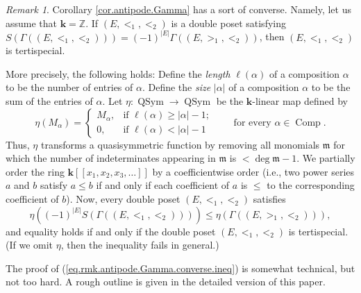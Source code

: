 \documentclass[12pt]{article}
\theoremstyle{plain}
\theoremstyle{definition}
\theoremstyle{remark}
\newtheorem{remark}[theorem]{Remark}
\newcommand{\kk}{{\mathbf{k}}}
\newcommand{\Comp}{{\operatorname{Comp}}}
\newcommand{\QSym}{{\operatorname{QSym}}}
\newcommand{\ZZ}{{\mathbb{Z}}}
\begin{document}
\begin{remark}
\label{rmk.antipode.Gamma.converse}
Corollary \ref{cor.antipode.Gamma} has a
sort of converse. Namely, let us assume that $\kk = \ZZ$. If
$\left(  E,<_{1},<_{2}\right)  $ is a double poset satisfying $S\left(
\Gamma\left(  \left(  E,<_{1},<_{2}\right)  \right)  \right)  =\left(
-1\right)  ^{\left\vert E\right\vert }\Gamma\left(  \left(  E,>_{1}%
,<_{2}\right)  \right)  $, then $\left(  E,<_{1},<_{2}\right)  $ is tertispecial.

More precisely, the following holds: Define the \textit{length} $\ell\left(
\alpha\right)  $ of a composition $\alpha$ to be the number of entries of
$\alpha$. Define the \textit{size} $\left\vert \alpha\right\vert $ of a
composition $\alpha$ to be the sum of the entries of $\alpha$. Let
$\eta : \QSym \to \QSym$ be the $\kk$-linear map defined by
\[
\eta \left( M_{\alpha} \right)
=
\begin{cases}
M_{\alpha}, & \text{if }\ell\left(  \alpha\right)  \geq\left\vert
\alpha\right\vert -1;\\
0, & \text{if }\ell\left(  \alpha\right)  <\left\vert \alpha\right\vert -1
\end{cases}
\qquad \text{for every } \alpha \in \Comp .
\]
Thus, $\eta$ transforms a quasisymmetric function by removing all monomials
$\mathfrak{m}$ for which the number of indeterminates appearing in
$\mathfrak{m}$ is $<\deg\mathfrak{m}-1$. We partially order the ring
$\mathbf{k}\left[  \left[ x_1, x_2, x_3, \ldots \right]  \right]  $
by a coefficientwise
order (i.e., two power series $a$ and $b$ satisfy $a\leq b$ if and only if
each coefficient of $a$ is $\leq$ to the corresponding coefficient of $b$).
Now, every double poset $\left(  E,<_{1},<_{2}\right)  $ satisfies
\begin{equation}
\eta\left(  \left(  -1\right)  ^{\left\vert E\right\vert }S\left(
\Gamma\left(  \left(  E,<_{1},<_{2}\right)  \right)  \right)  \right)
\leq\eta\left(  \Gamma\left(  \left(  E,>_{1},<_{2}\right)  \right)  \right)
,\label{eq.rmk.antipode.Gamma.converse.ineq}%
\end{equation}
and equality holds if and only if the double poset $\left(  E,<_{1}%
,<_{2}\right)  $ is tertispecial. (If we omit $\eta$, then the inequality
fails in general.)

The proof of (\ref{eq.rmk.antipode.Gamma.converse.ineq}) is somewhat
technical, but not too hard. A rough outline is given in the detailed
version of this paper.
\end{remark}
\end{document}
